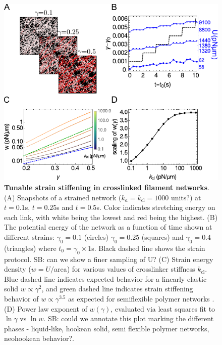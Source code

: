 \documentclass[11pt]{article}
\begin{document}
\begin{figure}[H]
  \centering
  \includegraphics[width=0.8\columnwidth]{figs/elasticity/shear_result.pdf}
  \caption{%
    \label{fig:stress}%
    {\bf Tunable strain stiffening in crosslinked filament networks}. (A) Snapshots of a strained network ($k_a=k_\text{cl}=1000$ {\color{blue}units?}) at $t=0.1$s, $t=0.25$s and $t=0.5$s. 
    Color indicates stretching energy on each link, with white being the lowest and red being the highest. 
    (B) The potential energy of the network as a function of time shown at different strains: $\gamma_0=0.1$ (circles) $\gamma_0=0.25$ (squares) and $\gamma_0=0.4$ (triangles) where $t_0=\gamma_0\times 1$s. Black dashed line shows the strain {\color{red}protocol}.  {\color{blue}SB: can we show a finer sampling of U?} 
    (C) Strain energy density ($w=U/$area) for various values of crosslinker stiffness $k_\text{cl}$. Blue dashed line
    indicates expected behavior for a {\color{red}linearly} elastic solid $w\propto \gamma^2$, and green dashed line indicates strain stiffening
    behavior of $w\propto \gamma^{3.5}$ as {\color{red}expected for semiflexible polymer networks} \cite{gardel2004,lin2010}.
   (D) Power law {\color{red}exponent} of $w(\gamma)$, evaluated via least squares fit to $\ln{\gamma}$ vs $\ln{w}$. {\color{blue}SB: could we annotate this plot marking the different phases - liquid-like, hookean solid, semi flexible polymer networks, neohookean behavior?}. 
  }
\end{figure}
\end{document}
